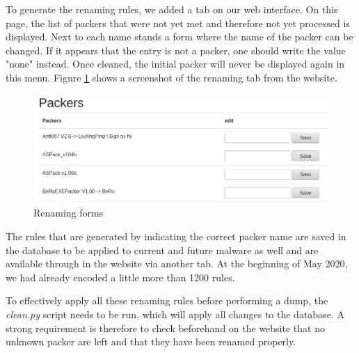To generate the renaming rules, we added a tab on our web interface. On this page, the list of packers that were not yet met and therefore not yet processed is displayed. Next to each name stands a form where the name of the packer can be changed. If it appears that the entry is not a packer, one should write the value "none" instead. Once cleaned, the initial packer will never be displayed again in this menu. Figure \ref{fig:cleaning} shows a screenshot of the renaming tab from the website.

\begin{figure}[!htb]
\centering
  \includegraphics[width=\linewidth]{Figures/cleaning.png}
  \caption{Renaming forms}
  \label{fig:cleaning}
\end{figure}

The rules that are generated by indicating the correct packer name are saved in the database to be applied to current and future malware as well and are available through in the website via another tab. At the beginning of May 2020, we had already encoded a little more than 1200 rules.

To effectively apply all these renaming rules before performing a dump, the \textit{clean.py} script needs to be run, which will apply all changes to the database. A strong requirement is therefore to check beforehand on the website that no unknown packer are left and that they have been renamed properly.